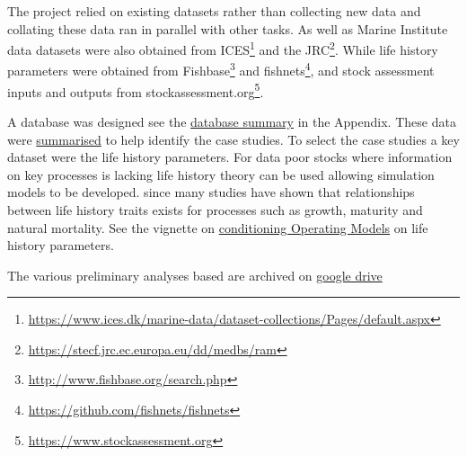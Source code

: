 The project relied on existing datasets rather than collecting new data and collating these data ran in parallel with other tasks. As well as Marine Institute data datasets were also obtained from ICES\footnote{\url{https://www.ices.dk/marine-data/dataset-collections/Pages/default.aspx}} and the JRC\footnote{\url{https://stecf.jrc.ec.europa.eu/dd/medbs/ram}}. While life history parameters were obtained from Fishbase\footnote{\url{http://www.fishbase.org/search.php}} and fishnets\footnote{\url{https://github.com/fishnets/fishnets}}, and stock assessment inputs and outputs from stockassessment.org\footnote{\url{https://www.stockassessment.org}}.

A database was designed see the \hyperref[appendix:db]{database summary} in the Appendix. These data were \href{https://3o2y9wugzp1kfxr5hvzgzq-on.drv.tw/MyDas/tasks/1/stockprioritisation.nb.html}{summarised} to help identify the case studies. To select the case studies a key dataset were the life history parameters. For data poor stocks where information on key processes is lacking life history theory can be used allowing simulation models to be developed. since many studies have shown that relationships between life history traits exists for processes such as growth, maturity and natural mortality. See the vignette on \href{https://3o2y9wugzp1kfxr5hvzgzq-on.drv.tw/MyDas/vignettes/conditioning.html}{conditioning Operating Models} on life history parameters. 

The various preliminary analyses based are archived on \href{https://drive.google.com/drive/folders/1pzXh8j-Y4dtJikFqP7RUuwBu0XY0a9ao?usp=sharing}{google drive} 


